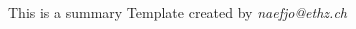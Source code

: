 



\maketitle
\begin{center}
    This is a summary Template created by \textit{naefjo@ethz.ch}
\end{center}
\newpage
\begin{multicols*}{3}



\end{multicols*}     

